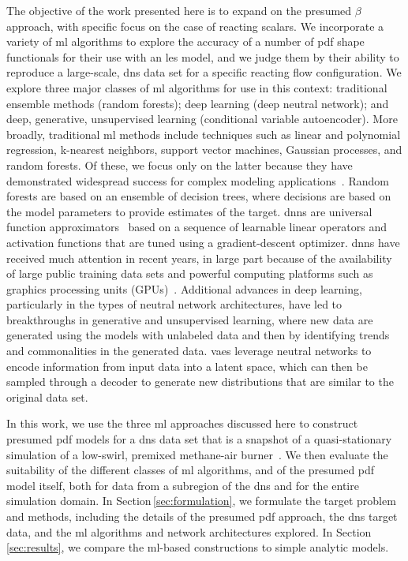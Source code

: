 \documentclass[review]{elsarticle}
\begin{document}
The objective of the work presented here is to expand on the presumed
$\beta$ approach, with specific focus on the case of
reacting scalars. We incorporate a variety of \gls{ml} algorithms to
explore the accuracy of a number of \gls{pdf} shape functionals for
their use with an \gls{les} model, and we judge them by their ability to
reproduce a large-scale, \gls{dns} data set for a specific reacting flow
configuration. We explore three major classes of \gls{ml} algorithms
for use in this context: traditional ensemble methods (random
forests); deep learning (deep neutral network); and deep, generative,
unsupervised learning (conditional variable autoencoder). More
broadly, traditional \gls{ml} methods include techniques such as
linear and polynomial regression, k-nearest neighbors, support vector
machines, Gaussian processes, and random forests. Of these, we focus
only on the latter because they have demonstrated widespread success for
complex modeling
applications~\cite{Fernandez-Delgado2014,Liaw2002}. Random forests are
based on an ensemble of decision trees, where decisions are based on
the model parameters to provide estimates of the
target. \Glspl{dnn} are universal function
approximators~\cite{Cybenko1989,Hornik1991} based on a sequence of
learnable linear operators and activation functions that are tuned
using a gradient-descent optimizer. \Glspl{dnn} have received much
attention in recent years, in large part because of the availability of large
public training data sets and powerful computing platforms such as
graphics processing units (GPUs)~\cite{Goodfellow2016}. Additional
advances in deep learning, particularly in the types of neutral
network architectures, have led to breakthroughs in generative and
unsupervised learning, where new data are generated using the models
with unlabeled data and then by identifying trends and commonalities in
the generated data. \Glspl{vae} leverage neutral networks to encode
information from input data into a latent space, which can then be
sampled through a decoder to generate new distributions that are
similar to the original data set.

In this work, we use the three \gls{ml} approaches discussed here
to construct presumed \gls{pdf} models for a \gls{dns} data set
that is a snapshot of a quasi-stationary simulation of a low-swirl,
premixed methane-air burner~\cite{Day2012}. We then evaluate the
suitability of the different classes of \gls{ml} algorithms, and of
the presumed \gls{pdf} model itself, both for data from a subregion of
the \gls{dns} and for the entire simulation
domain. In Section\,\ref{sec:formulation}, we formulate the target
problem and methods, including the details of the presumed \gls{pdf}
approach, the \gls{dns} target data, and the \gls{ml} algorithms and
network architectures explored. In Section\,\ref{sec:results}, we
compare the \gls{ml}-based constructions to simple analytic models.
\end{document}
